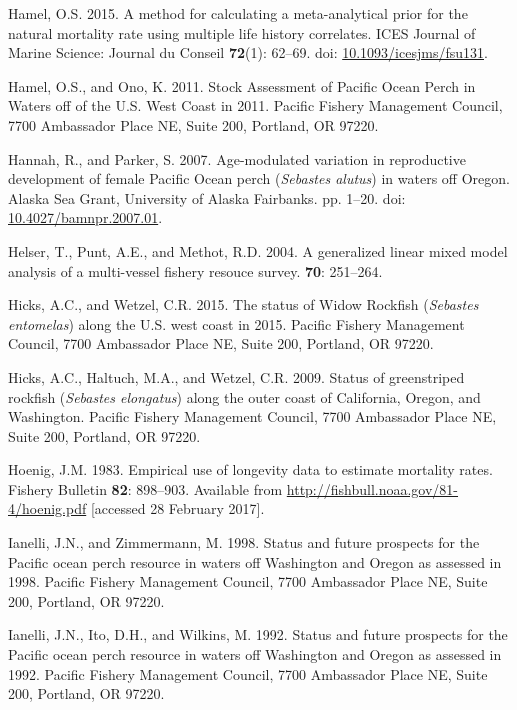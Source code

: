 \documentclass[12pt,]{article}
\begin{document}
\hypertarget{ref-hamel_method_2015}{}
Hamel, O.S. 2015. A method for calculating a meta-analytical prior for
the natural mortality rate using multiple life history correlates. ICES
Journal of Marine Science: Journal du Conseil \textbf{72}(1): 62--69.
doi:
\href{https://doi.org/10.1093/icesjms/fsu131}{10.1093/icesjms/fsu131}.

\hypertarget{ref-hamel_stock_2011}{}
Hamel, O.S., and Ono, K. 2011. Stock Assessment of Pacific Ocean Perch
in Waters off of the U.S. West Coast in 2011. Pacific Fishery Management
Council, 7700 Ambassador Place NE, Suite 200, Portland, OR 97220.

\hypertarget{ref-hannah_age-modulated_2007}{}
Hannah, R., and Parker, S. 2007. Age-modulated variation in reproductive
development of female Pacific Ocean perch (\emph{Sebastes alutus}) in
waters off Oregon. Alaska Sea Grant, University of Alaska Fairbanks. pp.
1--20. doi:
\href{https://doi.org/10.4027/bamnpr.2007.01}{10.4027/bamnpr.2007.01}.

\hypertarget{ref-helser_generalized_2004}{}
Helser, T., Punt, A.E., and Methot, R.D. 2004. A generalized linear
mixed model analysis of a multi-vessel fishery resouce survey.
\textbf{70}: 251--264.

\hypertarget{ref-hicks_status_2015}{}
Hicks, A.C., and Wetzel, C.R. 2015. The status of Widow Rockfish
(\emph{Sebastes entomelas}) along the U.S. west coast in 2015. Pacific
Fishery Management Council, 7700 Ambassador Place NE, Suite 200,
Portland, OR 97220.

\hypertarget{ref-hicks_status_2009}{}
Hicks, A.C., Haltuch, M.A., and Wetzel, C.R. 2009. Status of
greenstriped rockfish (\emph{Sebastes elongatus}) along the outer coast
of California, Oregon, and Washington. Pacific Fishery Management
Council, 7700 Ambassador Place NE, Suite 200, Portland, OR 97220.

\hypertarget{ref-hoenig_empirical_1983}{}
Hoenig, J.M. 1983. Empirical use of longevity data to estimate mortality
rates. Fishery Bulletin \textbf{82}: 898--903. Available from
\url{http://fishbull.noaa.gov/81-4/hoenig.pdf} {[}accessed 28 February
2017{]}.

\hypertarget{ref-ianelli_status_1998}{}
Ianelli, J.N., and Zimmermann, M. 1998. Status and future prospects for
the Pacific ocean perch resource in waters off Washington and Oregon as
assessed in 1998. Pacific Fishery Management Council, 7700 Ambassador
Place NE, Suite 200, Portland, OR 97220.

\hypertarget{ref-ianelli_status_1992}{}
Ianelli, J.N., Ito, D.H., and Wilkins, M. 1992. Status and future
prospects for the Pacific ocean perch resource in waters off Washington
and Oregon as assessed in 1992. Pacific Fishery Management Council, 7700
Ambassador Place NE, Suite 200, Portland, OR 97220.
\end{document}
